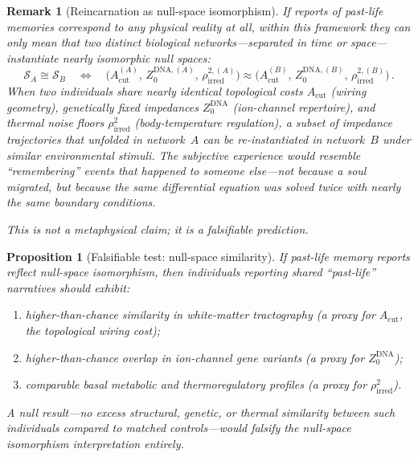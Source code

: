 \documentclass[aps,pre,twocolumn,superscriptaddress,floatfix]{revtex4-2}
\newtheorem{remark}{Remark}
\newtheorem{proposition}{Proposition}
\newcommand{\Acut}{A_{\text{cut}}}
\begin{document}
\begin{remark}[Reincarnation as null-space isomorphism]
If reports of past-life memories correspond to any physical
reality at all, within this framework they can only mean
that two distinct biological networks---separated in time
or space---instantiate nearly isomorphic null spaces:
\begin{equation}
  \mathcal{S}_A \cong \mathcal{S}_B
  \quad\Longleftrightarrow\quad
  \bigl(\Acut^{(A)},\, Z_0^{\text{DNA},(A)},\,
    \rho_{\text{irred}}^{2,(A)}\bigr)
  \approx
  \bigl(\Acut^{(B)},\, Z_0^{\text{DNA},(B)},\,
    \rho_{\text{irred}}^{2,(B)}\bigr)\,.
  \label{eq:null-space-isomorphism}
\end{equation}
When two individuals share nearly identical topological
costs $\Acut$ (wiring geometry), genetically fixed
impedances $Z_0^{\text{DNA}}$ (ion-channel repertoire),
and thermal noise floors $\rho_{\text{irred}}^2$
(body-temperature regulation), a subset of impedance
trajectories that unfolded in network~$A$ can be
\emph{re-instantiated} in network~$B$ under similar
environmental stimuli.
The subjective experience would resemble ``remembering''
events that happened to someone else---not because a soul
migrated, but because the same differential equation was
solved twice with nearly the same boundary conditions.

This is not a metaphysical claim; it is a falsifiable
prediction.
\end{remark}

\begin{proposition}[Falsifiable test: null-space similarity]
\label{prop:reincarnation-test}
If past-life memory reports reflect null-space isomorphism,
then individuals reporting shared ``past-life'' narratives
should exhibit:
\begin{enumerate}
  \item higher-than-chance similarity in white-matter
    tractography (a proxy for $\Acut$, the topological wiring
    cost);
  \item higher-than-chance overlap in ion-channel gene
    variants (a proxy for $Z_0^{\text{DNA}}$);
  \item comparable basal metabolic and thermoregulatory
    profiles (a proxy for $\rho_{\text{irred}}^2$).
\end{enumerate}
A null result---no excess structural, genetic, or thermal
similarity between such individuals compared to
matched controls---would falsify the null-space
isomorphism interpretation entirely.
\end{proposition}
\end{document}
